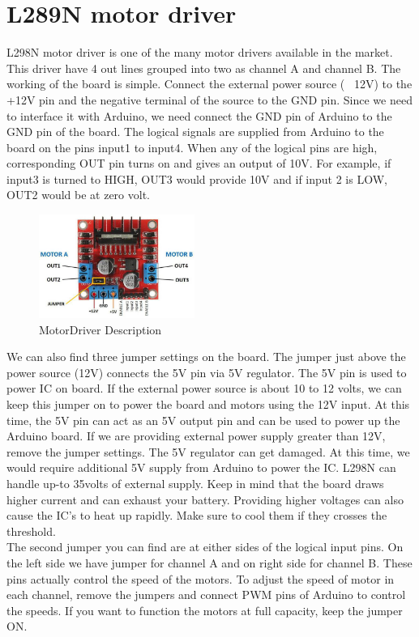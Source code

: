 \section{L289N motor driver}
L298N motor driver is one of the many motor drivers available in the market. This driver have 4 out lines grouped into two as channel A and channel B. The working of the board is simple. Connect the external power source ( ~12V) to the +12V pin and the negative terminal of the source to the GND pin. Since we need to interface it with Arduino, we need connect the GND pin of Arduino to the GND pin of the board. The logical signals are supplied from Arduino to the board on the pins input1 to input4. When any of the logical pins are high, corresponding OUT pin turns on and gives an output of 10V. For example, if input3 is turned to HIGH, OUT3 would provide 10V and if input 2 is LOW, OUT2 would be at zero volt. \\
\begin{figure}
    \centering
    \includegraphics[width=2in]{Chapters/images/MotorDriver_desp.png}
    \caption{MotorDriver Description}
\end{figure}
We can also find three jumper settings on the board. The jumper just above the power source (12V) connects the 5V pin via 5V regulator. The 5V pin is used to power IC on board. If the external power source is about 10 to 12 volts, we can keep this jumper on to power the board and motors using the 12V input. At this time, the 5V pin can act as an 5V output pin and can be used to power up the Arduino board. If we are providing external power supply greater than 12V, remove the jumper settings. The 5V regulator can get damaged. At this time, we would require additional 5V supply from Arduino to power the IC. L298N can handle up-to 35volts of external supply. Keep in mind that the board draws higher current and can exhaust your battery. Providing higher voltages can also cause the IC’s to heat up rapidly. Make sure to cool them if they crosses the threshold. \\
The second jumper you can find are at either sides of the logical input pins. On the left side we have jumper for channel A and on right side for channel B. These pins actually control the speed of the motors. To adjust the speed of motor in each channel, remove the jumpers and connect PWM pins of Arduino to control the speeds. If you want to function the motors at full capacity, keep the jumper ON.

